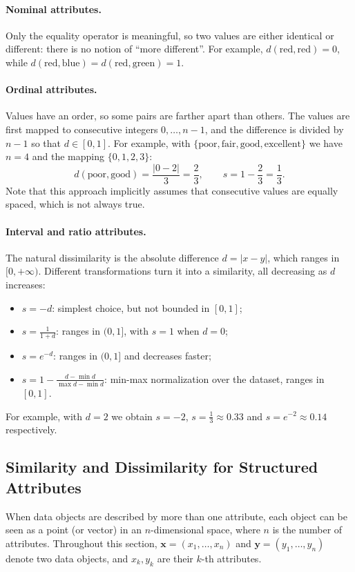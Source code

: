 \paragraph{Nominal attributes.} Only the equality operator is meaningful, so two values are either identical or different: there is no notion of ``more different''. For example, $d(\text{red},\text{red})=0$, while $d(\text{red},\text{blue})=d(\text{red},\text{green})=1$.
 
\paragraph{Ordinal attributes.} Values have an order, so some pairs are farther apart than others. The values are first mapped to consecutive integers $0,\dots,n-1$, and the difference is divided by $n-1$ so that $d\in[0,1]$. For example, with $\{\text{poor},\text{fair},\text{good},\text{excellent}\}$ we have $n=4$ and the mapping $\{0,1,2,3\}$:
\[
d(\text{poor},\text{good})=\frac{|0-2|}{3}=\frac{2}{3}, \qquad s=1-\frac{2}{3}=\frac{1}{3}.
\]
Note that this approach implicitly assumes that consecutive values are equally spaced, which is not always true.
 
\paragraph{Interval and ratio attributes.} The natural dissimilarity is the absolute difference $d=|x-y|$, which ranges in $[0,+\infty)$. Different transformations turn it into a similarity, all decreasing as $d$ increases:
\begin{itemize}
    \item $s=-d$: simplest choice, but not bounded in $[0,1]$;
    \item $s=\frac{1}{1+d}$: ranges in $(0,1]$, with $s=1$ when $d=0$;
    \item $s=e^{-d}$: ranges in $(0,1]$ and decreases faster;
    \item $s=1-\frac{d-\min d}{\max d-\min d}$: min-max normalization over the dataset, ranges in $[0,1]$.
\end{itemize}
For example, with $d=2$ we obtain $s=-2$, $s=\frac{1}{3}\approx0.33$ and $s=e^{-2}\approx0.14$ respectively.


\subsection{Similarity and Dissimilarity for Structured Attributes}
When data objects are described by more than one attribute, each object can be seen as a point (or vector) in an $n$-dimensional space, where $n$ is the number of attributes. Throughout this section, $\mathbf{x}=(x_1,\dots,x_n)$ and $\mathbf{y}=(y_1,\dots,y_n)$ denote two data objects, and $x_k, y_k$ are their $k$-th attributes.

